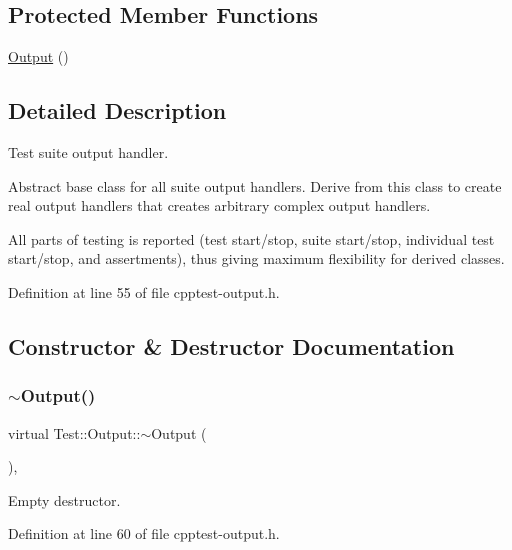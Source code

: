 \subsection*{Protected Member Functions}
\begin{DoxyCompactItemize}
\item 
\mbox{\hyperlink{class_test_1_1_output_acbffb6b160039caafd3e9ac11cace65c}{Output}} ()
\end{DoxyCompactItemize}


\subsection{Detailed Description}
Test suite output handler. 

Abstract base class for all suite output handlers. Derive from this class to create real output handlers that creates arbitrary complex output handlers.

All parts of testing is reported (test start/stop, suite start/stop, individual test start/stop, and assertments), thus giving maximum flexibility for derived classes. 

Definition at line 55 of file cpptest-\/output.\+h.



\subsection{Constructor \& Destructor Documentation}
\mbox{\label{class_test_1_1_output_a838de994609ac3d13b7d7cd389f56090}} 
\subsubsection{\texorpdfstring{$\sim$\+Output()}{~Output()}}
{\footnotesize\ttfamily virtual Test\+::\+Output\+::$\sim$\+Output (\begin{DoxyParamCaption}{ }\end{DoxyParamCaption})\hspace{0.3cm}{\ttfamily [inline]}, {\ttfamily [virtual]}}

Empty destructor. 

Definition at line 60 of file cpptest-\/output.\+h.

\mbox{\label{class_test_1_1_output_acbffb6b160039caafd3e9ac11cace65c}} 
